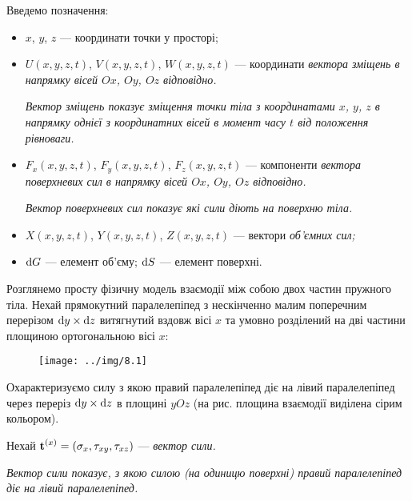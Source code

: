 Введемо позначення:
\begin{itemize}
	\item $x$, $y$, $z$ --- координати точки у просторі;
 	\item $U(x, y, z, t)$, $V(x, y, z, t)$, $W(x, y, z, t)$ --- координати \it{вектора зміщень} в напрямку вісей $Ox$, $Oy$, $Oz$ відповідно. \smallskip

 	\begin{remark}
 		\it{Вектор зміщень} показує зміщення точки тіла з координатами $x$, $y$, $z$ в напрямку однієї з координатних вісей в момент часу $t$ від положення рівноваги.
 	\end{remark}

	\item $F_x(x, y, z, t)$, $F_y(x, y, z, t)$, $F_z(x, y, z, t)$ --- компоненти \it{вектора поверхневих сил} в напрямку вісей $Ox$, $Oy$, $Oz$ відповідно. \smallskip

	\begin{remark}
		\it{Вектор поверхневих сил} показує які сили діють на поверхню тіла.
	\end{remark}

	\item $X(x, y, z, t)$, $Y(x, y, z, t)$, $Z(x, y, z, t)$ --- вектори \it{об'ємних сил};
	
	\item $\diff G$ --- елемент об'єму; $\diff S$ --- елемент поверхні.
\end{itemize}

Розглянемо просту фізичну модель взаємодії між собою двох частин пружного тіла. Нехай прямокутний паралелепіпед з нескінченно малим поперечним перерізом $\diff y \times \diff z$ витягнутий вздовж вісі $x$ та умовно розділений на дві частини площиною ортогональною вісі $x$:
\begin{figure}[H]
	\centering
	\texttt{[image: ../img/8.1]}
\end{figure}

Охарактеризуємо силу з якою правий паралелепіпед діє на лівий паралелепіпед через переріз $\diff y \times \diff z$ в площині $yOz$ (на рис. площина взаємодії виділена сірим кольором). \medskip

Нехай $\bf{t}^{(x)} = \left( \sigma_x, \tau_{xy}, \tau_{xz} \right)$ --- \it{вектор сили}.

\begin{definition}
	\it{Вектор сили} показує, з якою силою (на одиницю поверхні) правий паралелепіпед діє на лівий паралелепіпед.
\end{definition}

